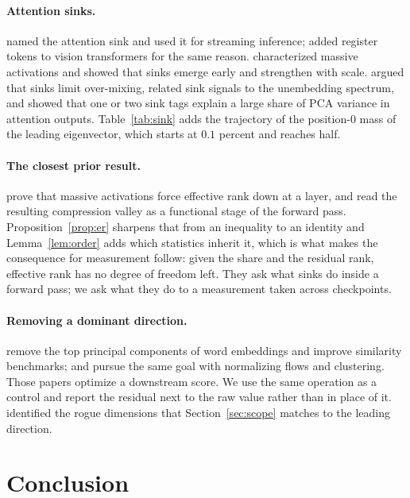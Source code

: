 \documentclass{article}
\theoremstyle{spaced}
\theoremstyle{definition}
\begin{document}
\paragraph{Attention sinks.} \citet{xiao2024efficient} named the attention sink and used it for streaming inference; \citet{darcet2024registers} added register tokens to vision transformers for the same reason. \citet{sun2024massive} characterized massive activations and \citet{gu2025attention} showed that sinks emerge early and strengthen with scale. \citet{barbero2025first} argued that sinks limit over-mixing, \citet{cancedda2024spectral} related sink signals to the unembedding spectrum, and \citet{zhang2025catch} showed that one or two sink tags explain a large share of PCA variance in attention outputs. Table~\ref{tab:sink} adds the trajectory of the position-0 mass of the leading eigenvector, which starts at $0.1$ percent and reaches half.

\paragraph{The closest prior result.} \citet{queipodellano2025sinks} prove that massive activations force effective rank down at a layer, and read the resulting compression valley as a functional stage of the forward pass. Proposition~\ref{prop:er} sharpens that from an inequality to an identity and Lemma~\ref{lem:order} adds which statistics inherit it, which is what makes the consequence for measurement follow: given the share and the residual rank, effective rank has no degree of freedom left. They ask what sinks do inside a forward pass; we ask what they do to a measurement taken across checkpoints.

\paragraph{Removing a dominant direction.} \citet{mu2018allbutthetop} remove the top principal components of word embeddings and improve similarity benchmarks; \citet{li2020sentence} and \citet{rajaee2021cluster} pursue the same goal with normalizing flows and clustering. Those papers optimize a downstream score. We use the same operation as a control and report the residual next to the raw value rather than in place of it. \citet{timkey2021all} identified the rogue dimensions that Section~\ref{sec:scope} matches to the leading direction.

\section{Conclusion}
\end{document}
